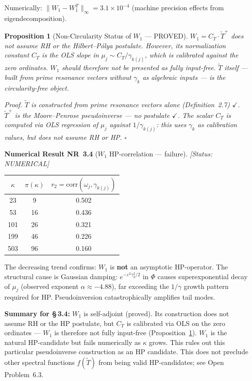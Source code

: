 \documentclass[11pt]{article}
\newtheorem{proposition}[theorem]{Proposition}
\newcommand{\Tt}{\widetilde{T}}
\newcommand{\CT}{C_{T}}
\newcommand{\Wone}{W_1}
\begin{document}
Numerically: $\|\Wone - \Wone^T\|_\infty = 3.1\times 10^{-4}$
(machine precision effects from eigendecomposition).

\begin{proposition}[Non-Circularity Status of $\Wone$ --- PROVED]\label{prop:W1-circ}
$\Wone = \CT\cdot\Tt^+$ does not assume RH or the Hilbert--P\'olya postulate.
However, its normalization constant $\CT$ is the OLS slope in
$\mu_j\sim\CT/\gamma_{k(j)}$, which is calibrated against the zero ordinates.
$\Wone$ should therefore not be presented as fully input-free.
$\Tt$ itself --- built from prime resonance vectors without $\gamma_k$
as algebraic inputs --- is the circularity-free object.

\emph{Proof.}
$\Tt$ is constructed from prime resonance vectors alone
(Definition~2.7) $\checkmark$.
$\Tt^+$ is the Moore--Penrose pseudoinverse --- no postulate $\checkmark$.
The scalar $\CT$ is computed via OLS regression of $\mu_j$ against
$1/\gamma_{k(j)}$: this uses $\gamma_k$ as calibration values, but
does not assume RH or HP. $\square$
\end{proposition}

\textbf{Numerical Result NR~3.4} ($\Wone$ HP-correlation --- failure).
\emph{[Status: NUMERICAL]}

\begin{center}
\begin{tabular}{ccc}
\toprule
$\kappa$ & $\pi(\kappa)$ & $r_2 = \mathrm{corr}(\omega_j,\gamma_{k(j)})$ \\
\midrule
23  & 9  & 0.502 \\
53  & 16 & 0.436 \\
101 & 26 & 0.321 \\
199 & 46 & 0.226 \\
503 & 96 & 0.160 \\
\bottomrule
\end{tabular}
\end{center}

The decreasing trend confirms: $\Wone$ is \textbf{not} an asymptotic
HP-operator.
The structural cause is Gaussian damping: $e^{-\varepsilon^2\gamma_k^2/2}$
in $\Phi$ causes superexponential decay of $\mu_j$
(observed exponent $\alpha\approx -4.88$),
far exceeding the $1/\gamma$ growth pattern required for HP.
Pseudoinversion catastrophically amplifies tail modes.

\textbf{Summary for \S\,3.4:}
$\Wone$ is self-adjoint (proved).
Its construction does not assume RH or the HP postulate, but $\CT$
is calibrated via OLS on the zero ordinates --- $\Wone$ is therefore
not fully input-free (Proposition~\ref{prop:W1-circ}).
$\Wone$ is the natural HP-candidate but fails numerically as
$\kappa$ grows.
This rules out this particular pseudoinverse construction as an HP candidate.
This does not preclude other spectral functions $f(\Tt)$ from being valid
HP-candidates; see Open Problem~6.3.
\end{document}
